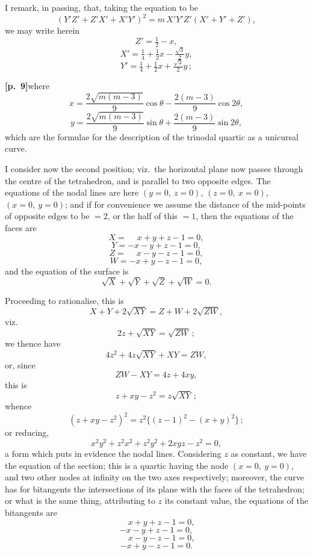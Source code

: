 \documentclass[11pt,a4paper]{article}
\begin{document}
I remark, in passing, that, taking the equation to be
\[
(Y'Z' + Z'X' + X'Y')^{2} = m\, X'Y'Z'(X' + Y' + Z'),
\]
we may write herein
\[
Z' = \tfrac{1}{2} - x,
\]
\[
X' = \tfrac{1}{4} + \tfrac{1}{2}x - \tfrac{\sqrt{3}}{2}y,
\]
\[
Y' = \tfrac{1}{4} + \tfrac{1}{2}x + \tfrac{\sqrt{3}}{2}y\,;
\]

\noindent\textbf{[p.~9]}\quad where
\[
x = \frac{2\sqrt{m(m-3)}}{9}\cos\theta - \frac{2(m-3)}{9}\cos 2\theta,
\]
\[
y = \frac{2\sqrt{m(m-3)}}{9}\sin\theta + \frac{2(m-3)}{9}\sin 2\theta,
\]
which are the formulae for the description of the trinodal quartic as a unicursal curve.

\medskip

I consider now the second position; viz.\ the horizontal plane now passes through the centre of the tetrahedron, and is parallel to two opposite edges. The equations of the nodal lines are here $(y=0,\ z=0)$, $(z=0,\ x=0)$, $(x=0,\ y=0)$; and if for convenience we assume the distance of the mid-points of opposite edges to be $=2$, or the half of this $=1$, then the equations of the faces are
\[
X = \phantom{-}x + y + z - 1 = 0,
\]
\[
Y = -x - y + z - 1 = 0,
\]
\[
Z = \phantom{-}x - y - z - 1 = 0,
\]
\[
W = -x + y - z - 1 = 0,
\]
and the equation of the surface is
\[
\sqrt{X} + \sqrt{Y} + \sqrt{Z} + \sqrt{W} = 0.
\]

Proceeding to rationalise, this is
\[
X + Y + 2\sqrt{XY} = Z + W + 2\sqrt{ZW},
\]
viz.
\[
2z + \sqrt{XY} = \sqrt{ZW}\,;
\]
we thence have
\[
4z^{2} + 4z\sqrt{XY} + XY = ZW,
\]
or, since
\[
ZW - XY = 4z + 4xy,
\]
this is
\[
z + xy - z^{2} = z\sqrt{XY}\,;
\]
whence
\[
(z + xy - z^{2})^{2} = z^{2}\{(z - 1)^{2} - (x + y)^{2}\}\,;
\]
or reducing,
\[
x^{2}y^{2} + z^{2}x^{2} + z^{2}y^{2} + 2xyz - z^{2} = 0,
\]
a form which puts in evidence the nodal lines. Considering $z$ as constant, we have the equation of the section; this is a quartic having the node $(x=0,\ y=0)$, and two other nodes at infinity on the two axes respectively; moreover, the curve has for bitangents the intersections of its plane with the faces of the tetrahedron; or what is the same thing, attributing to $z$ its constant value, the equations of the bitangents are
\[
\phantom{-}x + y + z - 1 = 0,
\]
\[
-x - y + z - 1 = 0,
\]
\[
\phantom{-}x - y - z - 1 = 0,
\]
\[
-x + y - z - 1 = 0.
\]

\bigskip
\end{document}
